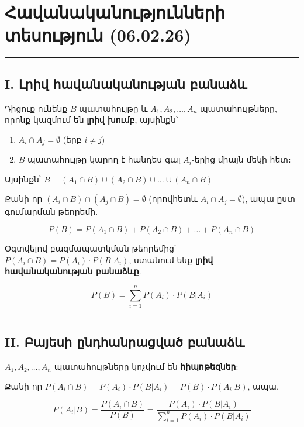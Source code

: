 \documentclass[12pt, a4paper]{article}
\begin{document}
\section{Հավանականությունների տեսություն (06.02.26)}

\tableofcontents
\vspace{2em}
\hrule
\vspace{2em}

\subsection{\textbf{I. Լրիվ հավանականության բանաձև}}

Դիցուք ունենք $B$ պատահույթը և $A_1, A_2, \dots, A_n$ պատահույթները, որոնք կազմում են \textbf{լրիվ խումբ}, այսինքն՝

\begin{enumerate}
    \item $A_i \cap A_j = \emptyset$ (երբ $i \neq j$)
    \item $B$ պատահույթը կարող է հանդես գալ $A_i$-երից միայն մեկի հետ։
\end{enumerate}

Այսինքն՝ $B = (A_1 \cap B) \cup (A_2 \cap B) \cup \dots \cup (A_n \cap B)$

Քանի որ $(A_i \cap B) \cap (A_j \cap B) = \emptyset$ (որովհետև $A_i \cap A_j = \emptyset$), ապա ըստ գումարման թեորեմի.

$$P(B) = P(A_1 \cap B) + P(A_2 \cap B) + \dots + P(A_n \cap B)$$

Օգտվելով բազմապատկման թեորեմից՝ $P(A_i \cap B) = P(A_i) \cdot P(B|A_i)$, ստանում ենք \textbf{լրիվ հավանականության բանաձևը}.

$$P(B) = \sum_{i=1}^{n} P(A_i) \cdot P(B|A_i)$$

\vspace{1em}
\hrule
\vspace{1em}

\subsection{\textbf{II. Բայեսի ընդհանրացված բանաձև}}

$A_1, A_2, \dots, A_n$ պատահույթները կոչվում են \textbf{հիպոթեզներ}:

Քանի որ $P(A_i \cap B) = P(A_i) \cdot P(B|A_i) = P(B) \cdot P(A_i|B)$, ապա.

$$P(A_i|B) = \frac{P(A_i \cap B)}{P(B)} = \frac{P(A_i) \cdot P(B|A_i)}{\sum_{i=1}^{n} P(A_i) \cdot P(B|A_i)}$$
\end{document}
